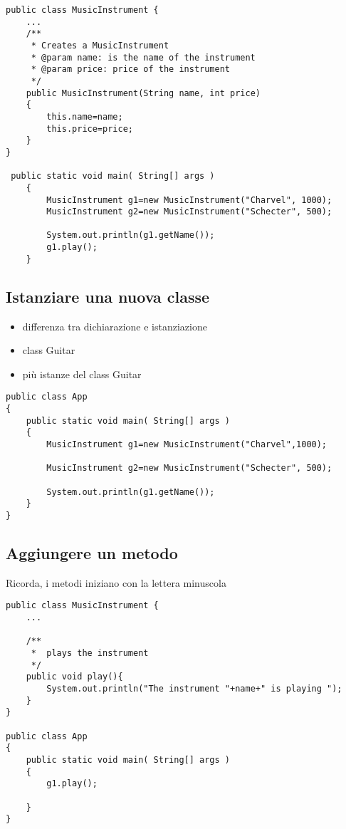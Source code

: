 \documentclass{article}
\begin{document}
\begin{lstlisting}
public class MusicInstrument {
	...
	/**
	 * Creates a MusicInstrument
	 * @param name: is the name of the instrument
	 * @param price: price of the instrument
	 */
	public MusicInstrument(String name, int price)
	{
		this.name=name;
		this.price=price;
	}
}

 public static void main( String[] args )
    {
    	MusicInstrument g1=new MusicInstrument("Charvel", 1000);
    	MusicInstrument g2=new MusicInstrument("Schecter", 500);
    	
    	System.out.println(g1.getName());
    	g1.play();
    }
\end{lstlisting}

\subsection{Istanziare una nuova classe}
\begin{itemize}
\item differenza tra dichiarazione e istanziazione
\item class Guitar
\item pi\`u istanze del class Guitar
\end{itemize}


\begin{lstlisting}
public class App 
{
    public static void main( String[] args )
    {
    	MusicInstrument g1=new MusicInstrument("Charvel",1000);
    	
    	MusicInstrument g2=new MusicInstrument("Schecter", 500);
    	
    	System.out.println(g1.getName());
    }
}
\end{lstlisting}





\subsection{Aggiungere un metodo}
Ricorda, i metodi iniziano con la lettera minuscola

\begin{lstlisting}
public class MusicInstrument {
	...

	/**
	 *  plays the instrument
	 */
	public void play(){
		System.out.println("The instrument "+name+" is playing ");
	}
}

public class App 
{
    public static void main( String[] args )
    {
    	g1.play();
    	
    }
}
\end{lstlisting}
\end{document}
